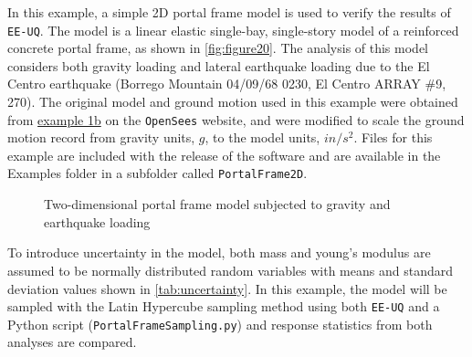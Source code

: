 In this example, a simple 2D portal frame model is used to verify the
results of \texttt{EE-UQ}. The model is a linear elastic single-bay,
single-story model of a reinforced concrete portal frame, as shown in
\autoref{fig:figure20}. The analysis of this model considers both
gravity loading and lateral earthquake loading due to the El Centro
earthquake (Borrego Mountain 04/09/68 0230, El Centro ARRAY \#9, 270).
The original model and ground motion used in this example were
obtained from
\href{http://opensees.berkeley.edu/wiki/index.php/OpenSees_Example_1b._Elastic_Portal_Frame}{example 1b} on the \texttt{OpenSees} website, 
and were modified to scale the ground motion record from gravity
units, $g$, to the model units, $in/s^2$. Files for this example are
included with the release of the software and are available in the
Examples folder in a subfolder called \texttt{PortalFrame2D}.

\begin{figure}[!htbp]
  \caption{Two-dimensional portal frame model subjected to gravity and earthquake loading}
  \label{fig:figure20}
\end{figure}

To introduce uncertainty in the model, both mass and young’s modulus
are assumed to be normally distributed random variables with means and
standard deviation values shown in \autoref{tab:uncertainty}. In this
example, the model will be sampled with the Latin Hypercube sampling
method using both \texttt{EE-UQ} and a Python script
(\texttt{PortalFrameSampling.py}) and response statistics from both
analyses are compared.


